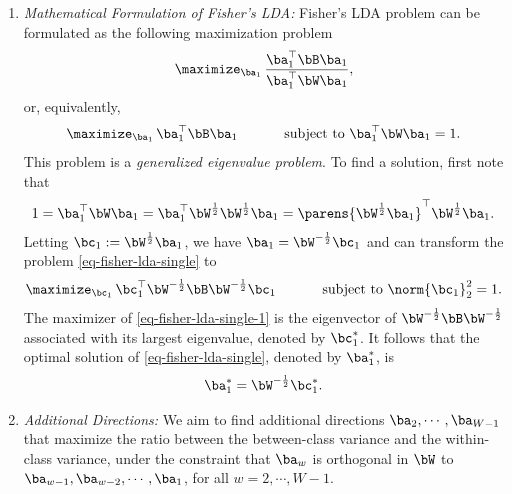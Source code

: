 \documentclass[12pt]{article}
\begin{document}
\begin{enumerate}[label=\textbf{\arabic*.}]
\begin{enumerate}
		\item \textit{Mathematical Formulation of Fisher's LDA:} Fisher's LDA problem can be formulated as the following maximization problem 
		\begin{align*}
			\maximize_{\ba_1} \, \frac{\ba_1^\top \bB \ba_1}{\ba_1^\top \bW \ba_1}, 
		\end{align*}
		or, equivalently, 
		\begin{align}\label{eq-fisher-lda-single}
			\maximize_{\ba_1} \, \ba_1^\top \bB \ba_1 \hspace{30pt} \text{ subject to } \ba_1^\top \bW \ba_1 = 1.  
		\end{align}
		This problem is a \emph{generalized eigenvalue problem}. To find a solution, first note that 
		\begin{align*}
			1 = \ba_1^\top \bW \ba_1 = \ba_1^\top \bW^{\frac{1}{2}} \bW^{\frac{1}{2}} \ba_1 = \parens{\bW^{\frac{1}{2}} \ba_1}^\top \bW^{\frac{1}{2}} \ba_1. 
		\end{align*}
		Letting $\bc_1 := \bW^{\frac{1}{2}} \ba_1$, we have $\ba_1 = \bW^{-\frac{1}{2}} \bc_1$ and can transform the problem \eqref{eq-fisher-lda-single} to 
		\begin{align}\label{eq-fisher-lda-single-1}
			\maximize_{\bc_1} \, \bc_1^\top \bW^{-\frac{1}{2}} \bB \bW^{-\frac{1}{2}} \bc_1 \hspace{30pt} \text{ subject to } \norm{\bc_1}_2^2 = 1.  
		\end{align}
		The maximizer of \eqref{eq-fisher-lda-single-1} is the eigenvector of $\bW^{-\frac{1}{2}} \bB \bW^{-\frac{1}{2}}$ associated with its largest eigenvalue, denoted by $\bc_1^*$. It follows that the optimal solution of \eqref{eq-fisher-lda-single}, denoted by $\ba_1^*$, is 
		\begin{align*}
			\ba_1^* = \bW^{-\frac{1}{2}} \bc_1^*. 
		\end{align*}
		
		\item \textit{Additional Directions:} We aim to find additional directions $\ba_2, \cdots, \ba_{W-1}$ that maximize the ratio between the between-class variance and the within-class variance, under the constraint that $\ba_{w}$ is orthogonal in $\bW$ to $\ba_{w-1}, \ba_{w-2}, \cdots, \ba_1$, for all $w = 2, \cdots, W-1$. 
		

\end{enumerate}
\end{enumerate}
\end{document}
